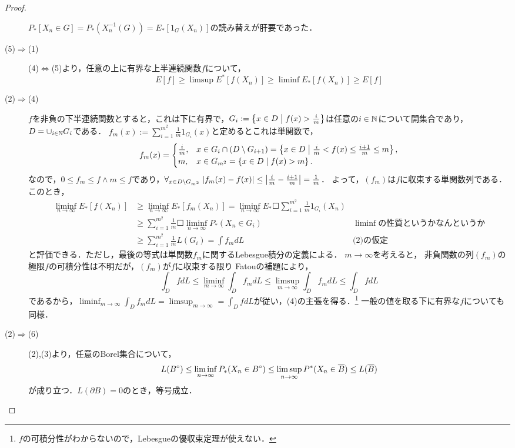 \documentclass[uplatex,dvipdfmx]{jsreport}
\begin{document}
\begin{proof}
\begin{description}
        $P_*[X_n\in G]=P_*(X_n^{-1}(G))=E_*[1_G(X_n)]$の読み替えが肝要であった．
        \item[(5)$\Rightarrow$(1)]
        (4)$\Leftrightarrow$(5)より，任意の上に有界な上半連続関数$f$について，
        \[E[f]\ge\limsup E^*[f(X_n)]\ge\liminf E_*[f(X_n)]\ge E[f]\]
        \item[(2)$\Rightarrow$(4)]
        $f$を非負の下半連続関数とすると，これは下に有界で，$G_i:=\left\{x\in D\;\middle|\;f(x)>\frac{i}{m}\right\}$は任意の$i\in\mathbb{N}$について開集合であり，$D=\cup_{i\in\mathbb{N}}G_i$である．
        $f_m(x):=\sum^{m^2}_{i=1}\frac{1}{m}1_{G_i}(x)$と定めるとこれは単関数で，
        \[f_m(x)=\begin{cases}
        \frac{i}{m},&x\in G_i\cap(D\setminus G_{i+1})=\left\{x\in D\;\middle|\;\frac{i}{m}<f(x)\le\frac{i+1}{m}\le m\right\},\\
        m,&x\in G_{m^2}=\left\{x\in D\mid f(x)>m\right\}.
        \end{cases}\]
        なので，$0\le f_m\le f\land m\le f$であり，$\forall_{x\in D\setminus G_{m^2}}\;\lvert f_m(x)-f(x)\rvert\le\left|\frac{i}{m}-\frac{i+1}{m}\right|=\frac{1}{m}$．
        よって，$(f_m)$は$f$に収束する単関数列である．
        このとき，
        \begin{align*}
            \liminf_{n\to\infty}E_*[f(X_n)]&\ge\liminf_{n\to\infty}E_*[f_m(X_n)]=\liminf_{n\to\infty}E_*\Square{\sum^{m^2}_{i=1}\frac{1}{m}1_{G_i}(X_n)}\\
            &\ge\sum^{m^2}_{i=1}\frac{1}{m}\Square{\liminf_{n\to\infty}P_*(X_n\in G_i)}&\liminf の性質というかなんというか\\
            &\ge\sum^{m^2}_{i=1}\frac{1}{m}L(G_i)=\int f_mdL&\text{(2)の仮定}
        \end{align*}
        と評価できる．ただし，最後の等式は単関数$f_m$に関するLebesgue積分の定義による．
        $m\to\infty$を考えると，
        非負関数の列$(f_m)$の極限$f$の可積分性は不明だが，$(f_m)$が$f$に収束する限り
        Fatouの補題により，
        \[\int_DfdL\le\liminf_{m\to\infty}\int_Df_mdL\le\limsup_{m\to\infty}\int_Df_mdL\le\int_DfdL\]
        であるから，$\liminf_{m\to\infty}\int_Df_mdL=\limsup_{m\to\infty}=\int_DfdL$が従い，(4)の主張を得る．\footnote{$f$の可積分性がわからないので，Lebesgueの優収束定理が使えない．}
        一般の値を取る下に有界な$f$についても同様．
        \item[(2)$\Rightarrow$(6)]
        (2),(3)より，任意のBorel集合について，
        \[L(B^\circ)\le\liminf_{n\to\infty}P_*(X_n\in B^\circ)\le\limsup_{n\to\infty}P^*(X_n\in\overline{B})\le L(\overline{B})\]
        が成り立つ．$L(\partial B)=0$のとき，等号成立．

\end{description}
\end{proof}
\end{document}
